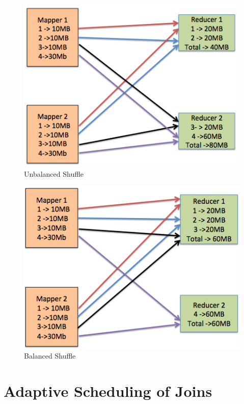  \begin{figure}[h]
\begin{center}
\includegraphics[scale=1.0]{./img/shuffle_unbalanced.png}
\caption{Unbalanced Shuffle} 
\label{fig:shuffle_unbalanced}
\end{center}
\end{figure}

 \begin{figure}[h]
\begin{center}
\includegraphics[scale=1.0]{./img/shuffle_balanced.png}
\caption{Balanced Shuffle}
\label{fig:shuffle_balanced}
\end{center}
\end{figure}

\section{Adaptive Scheduling of Joins}\label{intro-ch:eeg-overview}

